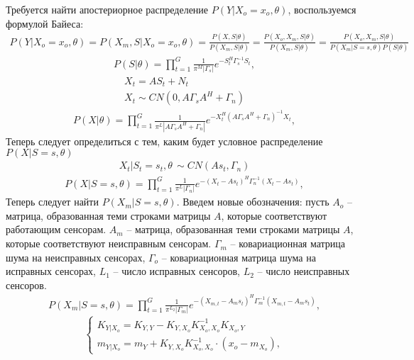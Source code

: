 \documentclass[11pt]{article}
\begin{document}
\begin{center}
\fontsize{16}{20}\selectfont {}
\end{center}
Требуется найти апостериорное распределение $P(Y|X_o=x_o,\theta)$, воспользуемся формулой Байеса:
\begin{gather}
P(Y|X_o=x_o,\theta) = P(X_m, S|X_o=x_o,\theta) = \frac{P(X, S|\theta)}{P(X_m, S|\theta)} = \frac{P(X_o, X_m, S|\theta)}{P(X_m, S|\theta)} = \frac{P(X_o, X_m, S|\theta)}{P(X_m|S=s, \theta)P(S|\theta)} 
\end{gather}
\begin{gather}
P(S|\theta) = \prod_{t=1}^G \frac{1}{\pi^M |\Gamma_s|}e^{-S_t^H\Gamma_s^{-1}S_t},
\end{gather}
\begin{gather*}
X_t = AS_t + N_t \\
X_t \sim CN(0, A\Gamma_s A^H + \Gamma_n)
\end{gather*}
\begin{gather}
P(X|\theta) = \prod_{t=1}^G \frac{1}{\pi^L |A\Gamma_s  A^H + \Gamma_n|}e^{-X_t^H (A\Gamma_s A^H + \Gamma_n)^{-1}X_t},
\end{gather}
Теперь следует определиться с тем, каким будет условное распределение $P(X|S=s, \theta)$
\begin{gather*}
X_t|S_t=s_t, \theta \, \sim CN(A s_t, \Gamma_n)
\end{gather*}
\begin{gather}
P(X|S=s,\theta) = \prod_{t=1}^G \frac{1}{\pi^L |\Gamma_n|}e^{-(X_t-A s_t)^H \Gamma_n^{-1}(X_t-A s_t)},
\end{gather}
Теперь следует найти $P(X_m|S=s, \theta)$. Введем новые обозначения: пусть $A_o$ -- матрица, образованная теми строками матрицы $A$, которые соответствуют работающим сенсорам. $A_m$ -- матрица, образованная теми строками матрицы $A$, которые соответствуют неисправным сенсорам. $\Gamma_m$ -- ковариационная матрица шума на неисправных сенсорах,  $\Gamma_o$ -- ковариационная матрица шума на исправных сенсорах, $L_1$ -- число исправных сенсоров, $L_2$ -- число неисправных сенсоров.
\begin{gather}
P(X_m|S=s,\theta) = \prod_{t=1}^G \frac{1}{\pi^{L_2} |\Gamma_m|}e^{-(X_{m,t}-A_m s_t)^H \Gamma_m^{-1}(X_{m,t}-A_m s_t)},
\end{gather}
\begin{equation}
\left\{ \begin{gathered} 
K_{Y|X_o} = K_{Y,Y}-K_{Y,X_o}K_{X_o,X_o}^{-1}K_{X_o,Y} \\
m_{Y|X_o} = m_{Y} + K_{Y,X_o}K_{X_o,X_o}^{-1}\cdot(x_o-m_{X_o}),
\end{gathered} \right.
\end{equation}
\end{document}
